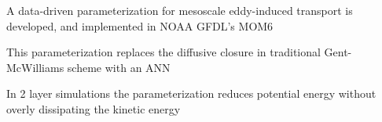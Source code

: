 \documentclass[draft]{agujournal2019}
\begin{document}






\begin{keypoints}
\item A data-driven parameterization for mesoscale eddy-induced transport is developed, and implemented in NOAA GFDL's MOM6
\item This parameterization replaces the diffusive closure in traditional Gent-McWilliams scheme with an ANN 
\item In 2 layer simulations the parameterization reduces potential energy without overly dissipating the kinetic energy
\end{keypoints}

%
%

%
%
\end{document}
